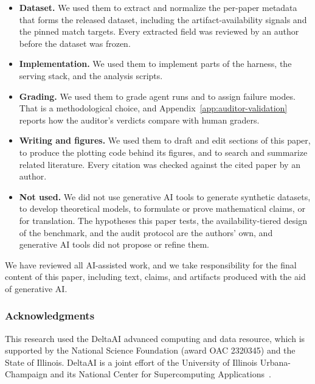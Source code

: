 \documentclass{article} %
\begin{document}
\begin{itemize}
\item \textbf{Dataset.} We used them to extract and normalize the per-paper
metadata that forms the released dataset, including the artifact-availability
signals and the pinned match targets. Every extracted field was reviewed by an
author before the dataset was frozen.
\item \textbf{Implementation.} We used them to implement parts of the harness,
the serving stack, and the analysis scripts.
\item \textbf{Grading.} We used them to grade agent runs and to assign
failure modes. That is a methodological choice, and
Appendix~\ref{app:auditor-validation} reports how the auditor's verdicts
compare with human graders.
\item \textbf{Writing and figures.} We used them to draft and edit sections of
this paper, to produce the plotting code behind its figures, and to search and
summarize related literature. Every citation was checked against the cited
paper by an author.
\item \textbf{Not used.} We did not use generative AI tools to generate
synthetic datasets, to develop theoretical models, to formulate or prove
mathematical claims, or for translation. The hypotheses this paper tests, the
availability-tiered design of the benchmark, and the audit protocol are the
authors' own, and generative AI tools did not propose or refine them.
\end{itemize}

We have reviewed all AI-assisted work, and we take responsibility for the
final content of this paper, including text, claims, and artifacts produced
with the aid of generative AI.

\subsubsection*{Acknowledgments}

This research used the DeltaAI advanced computing and data resource, which is
supported by the National Science Foundation (award OAC 2320345) and the State
of Illinois. DeltaAI is a joint effort of the University of Illinois
Urbana-Champaign and its National Center for Supercomputing
Applications~\citep{bode2025deltaai}.
\end{document}
